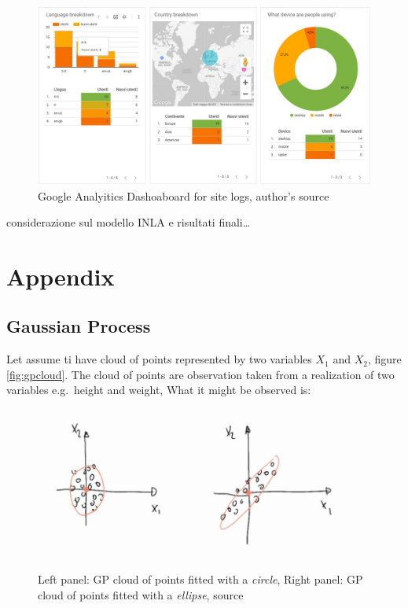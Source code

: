 \documentclass[
  12pt,
  a4paper,
  oneside]{book}
\theoremstyle{definition}
\theoremstyle{definition}
\theoremstyle{definition}
\theoremstyle{remark}
\begin{document}
\begin{figure}
\centering
\includegraphics{images/analytics_dashbboard.jpg}
\caption{\label{fig:gaanalytics}Google Analyitics Dashoaboard for site logs, author's source}
\end{figure}

considerazione sul modello INLA e risultati finali\ldots{}

\hypertarget{appendix}{%
\chapter*{Appendix}\label{appendix}}

\hypertarget{gpbasics}{%
\section{Gaussian Process}\label{gpbasics}}

Let assume ti have cloud of points represented by two variables \(X_1\) and \(X_2\), figure \ref{fig:gpcloud}. The cloud of points are observation taken from a realization of two variables e.g.~height and weight, What it might be observed is:

\begin{figure}
\centering
\includegraphics{appendix_images/gp_base_1.jpg}
\caption{\label{fig:gpclouds}Left panel: GP cloud of points fitted with a \emph{circle}, Right panel: GP cloud of points fitted with a \emph{ellipse}, source \citet{YT:freitas1}}
\end{figure}
\end{document}

